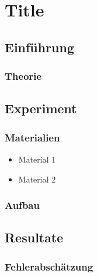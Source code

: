 \section{Title}
\subsection{Einführung}
\subsubsection{Theorie}
\subsection{Experiment}
\subsubsection{Materialien}
\begin{itemize}
    \item Material 1
    \item Material 2
\end{itemize}
\subsubsection{Aufbau}
\subsection{Resultate}
\subsubsection{Fehlerabschätzung}
